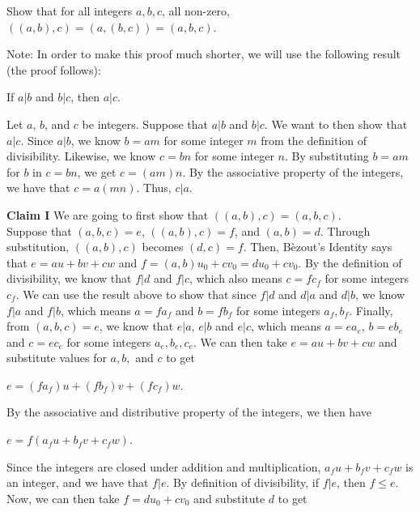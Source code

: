 \documentclass[12pt]{article}
\newenvironment{problem}[2][Problem]{\begin{trivlist}
\item[\hskip \labelsep {\bfseries #1}\hskip \labelsep {\bfseries #2.}]}{\end{trivlist}}
\begin{document}
\begin{problem}{2}
Show that for all integers $a,b,c$, all non-zero, $((a,b),c)=(a,(b,c))=(a,b,c)$.

\vspace{.3cm}

\noindent
Note: In order to make this proof much shorter, we will use the following result (the proof follows): 

\begin{center}
If $a|b$ and $b|c$, then $a|c$.
\end{center}

\noindent
Let $a$, $b$, and $c$ be integers. Suppose that $a|b$ and $b|c$. We want to then show that $a|c$. Since $a|b$, we know $b=am$ for some integer $m$ from the definition of divisibility. Likewise, we know $c=bn$ for some integer $n$. By substituting $b=am$ for $b$ in $c=bn$, we get $c=(am)n$. By the associative property of the integers, we have that $c=a(mn)$. Thus, $c|a$.

\vspace{.3cm}

\noindent
\textbf{Claim I} We are going to first show that $((a,b),c)=(a,b,c)$. \\

\noindent
Suppose that $(a,b,c)=e$, $((a,b),c)=f$, and $(a,b)=d$. Through substitution, $((a,b),c)$ becomes $(d,c)=f$. Then, B\`ezout's Identity says that $e=au+bv+cw$ and $f=(a,b)u_0+cv_0=du_0+cv_0$. By the definition of divisibility, we know that $f|d$ and $f|c$, which also means $c=fc_f$ for some integers $c_f$. We can use the result above to show that since $f|d$ and $d|a$ and $d|b$, we know $f|a$ and $f|b$, which means $a=fa_f$ and $b=fb_f$ for some integers $a_f, b_f$. Finally, from $(a,b,c)=e$, we know that $e|a$, $e|b$ and $e|c$, which means $a=ea_e$, $b=eb_e$ and $c=ec_e$ for some integers $a_e, b_e, c_e$. We can then take $e=au+bv+cw$ and substitute values for $a,b,$ and $c$ to get

\begin{center}
$e=(fa_f)u+(fb_f)v+(fc_f)w$.
\end{center}

\noindent
By the associative and distributive property of the integers, we then have 

\begin{center}
$e=f(a_fu+b_fv+c_fw)$.
\end{center}

\noindent
Since the integers are closed under addition and multiplication, $a_fu+b_fv+c_fw$ is an integer, and we have that $f|e$. By definition of divisibility, if $f|e$, then $f \leq e$. Now, we can then take $f=du_0+cv_0$ and substitute $d$ to get


\end{problem}
\end{document}
